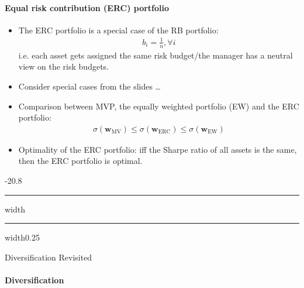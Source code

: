 \documentclass[a4paper,landscape,8pt,fleqn]{scrartcl}
\makeatletter
\renewcommand{\subsection}{\@startsection{subsection}{1}{0mm}%
{-2\baselineskip}{0.8\baselineskip}%
{\hrule depth 0.2pt width\columnwidth\hrule depth0.75pt
width0.25\columnwidth\vspace*{1.2em}\large\bfseries}}
\makeatother
\begin{document}
\begin{multicols*}{3}
\paragraph{Equal risk contribution (ERC) portfolio}
\begin{itemize}
\item The ERC portfolio is a special case of the RB portfolio:
\begin{align*}
b_i = \frac{1}{n}, \forall i
\end{align*}
i.e. each asset gets assigned the same risk budget/the manager has a neutral view on the risk budgets.
\item Consider special cases from the slides \ldots
\item Comparison between MVP, the equally weighted portfolio (EW) and the ERC portfolio:
\begin{align*}
\sigma(\bm w_\text{MV}) \leq \sigma(\bm w_\text{ERC}) \leq \sigma(\bm w_\text{EW})
\end{align*}
\item Optimality of the ERC portfolio: iff the Sharpe ratio of all assets is the same, then the ERC portfolio is optimal.
\end{itemize}

\subsection{Diversification Revisited}

\paragraph{Diversification}


\end{multicols*}
\end{document}
